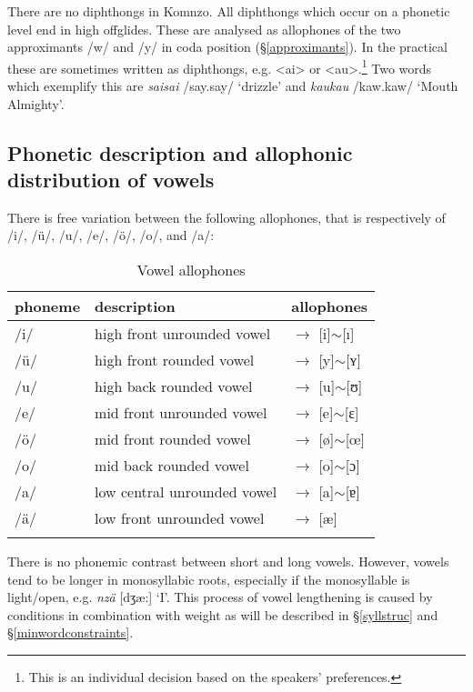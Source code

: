 There are no diphthongs in Komnzo. All diphthongs which occur on a phonetic level end in high offglides. These are analysed as allophones of the two approximants /w/ and /y/ in coda position (\S{}\ref{approximants}). In the practical  these are sometimes written as diphthongs, e.g. <ai> or <au>.\footnote{This is an individual decision based on the speakers' preferences.} Two words which exemplify this are \emph{saisai} /say.say/ `drizzle' and \emph{kaukau} /kaw.kaw/ `Mouth Almighty'.

\subsection{Phonetic description and allophonic distribution of vowels} \label{phonetic-description-vowels}

There is free variation between the following allophones, that is respectively of /i/, /ü/, /u/, /e/, /ö/, /o/, and /a/:

\begin{table}
\caption{Vowel allophones}
\label{allovowel}
	\begin{tabular}{lll}
		\lsptoprule
		phoneme&description&allophones\\\midrule
		/i/ &high front unrounded vowel &$\rightarrow$ [i]$\sim$[ı]\\
		/ü/ &high front rounded vowel &$\rightarrow$ [y]$\sim$[ʏ]\\
		/u/ &high back rounded vowel &$\rightarrow$ [u]$\sim$[ʊ]\\
		/e/ &mid front unrounded vowel &$\rightarrow$ [e]$\sim$[ɛ]\\
		/ö/ &mid front rounded vowel &$\rightarrow$ [ø]$\sim$[œ]\\
		/o/ &mid back rounded vowel &$\rightarrow$ [o]$\sim$[ɔ]\\
		/a/ &low central unrounded vowel &$\rightarrow$ [a]$\sim$[ɐ]\\
		/ä/ &low front unrounded vowel &$\rightarrow$ [æ]\\
		\lspbottomrule
	\end{tabular}
\end{table}%

There is no phonemic contrast between short and long vowels. However, vowels tend to be longer in monosyllabic roots, especially if the monosyllable is light/open, e.g. \emph{nzä} [dʒæ:] `I'. This process of vowel lengthening is caused by  conditions in combination with  weight as will be described in \S{}\ref{syllstruc} and \S{}\ref{minwordconstraints}.

